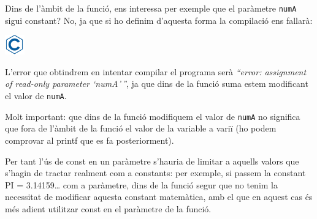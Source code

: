 \documentclass[]{book}
\newenvironment{Shaded}{\begin{snugshade}}{\end{snugshade}}
\newcommand{\DataTypeTok}[1]{\textcolor[rgb]{0.13,0.29,0.53}{#1}}
\newcommand{\DecValTok}[1]{\textcolor[rgb]{0.00,0.00,0.81}{#1}}
\newcommand{\SpecialCharTok}[1]{\textcolor[rgb]{0.00,0.00,0.00}{#1}}
\newcommand{\StringTok}[1]{\textcolor[rgb]{0.31,0.60,0.02}{#1}}
\newcommand{\ImportTok}[1]{#1}
\newcommand{\CommentTok}[1]{\textcolor[rgb]{0.56,0.35,0.01}{\textit{#1}}}
\newcommand{\ControlFlowTok}[1]{\textcolor[rgb]{0.13,0.29,0.53}{\textbf{#1}}}
\newcommand{\PreprocessorTok}[1]{\textcolor[rgb]{0.56,0.35,0.01}{\textit{#1}}}
\newcommand{\NormalTok}[1]{#1}
\begin{document}
Dins de l'àmbit de la funció, ens interessa per exemple que el paràmetre
\texttt{numA} sigui constant? No, ja que si ho definim d'aquesta forma
la compilació ens fallarà:

\includegraphics{./img/c.png}

\begin{Shaded}
\end{Shaded}

L'error que obtindrem en intentar compilar el programa serà
\emph{``error: assignment of read-only parameter `numA'\,''}, ja que
dins de la funció suma estem modificant el valor de \texttt{numA}.

Molt important: que dins de la funció modifiquem el valor de
\texttt{numA} no significa que fora de l'àmbit de la funció el valor de
la variable a variï (ho podem comprovar al printf que es fa
posteriorment).

Per tant l'ús de const en un paràmetre s'hauria de limitar a aquells
valors que s'hagin de tractar realment com a constants: per exemple, si
passem la constant PI = 3.14159\ldots{} com a paràmetre, dins de la
funció segur que no tenim la necessitat de modificar aquesta constant
matemàtica, amb el que en aquest cas és més adient utilitzar const en el
paràmetre de la funció.
\end{document}
